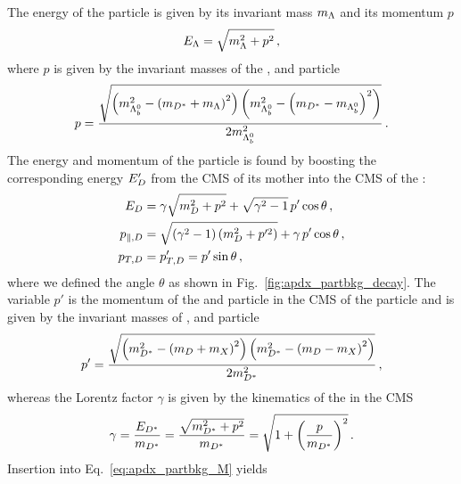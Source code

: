 The energy of the \Lz particle is given by its invariant mass $m_{{\Lambda}}$ and its momentum $p$
\begin{equation*}
    E_{{\Lambda}} = \sqrt{m_{{\Lambda}}^2 + p^2} \,,
\end{equation*}
where $p$ is given by the invariant masses of the \Lb, \Dstarz and \Lz particle
\begin{equation*}
    p = \frac{\sqrt{ \left(m_{{{\Lambda}^0_{b}}}^2 - \left(m_{{{D}^*}} + m_{{\Lambda}} \right)^2 \right) \left( m_{{{\Lambda}^0_{b}}}^2 - \left(m_{{{D}^*}} - m_{{{\Lambda}^0_{b}}} \right)^2 \right) }}{2 m_{{{\Lambda}^0_{b}}}^2} \,.
\end{equation*}
The energy and momentum of the \Dz particle is found by boosting the corresponding energy $E'_{D}$ from the CMS of its mother \Dstarz into the CMS of the \Lb:
\begin{align*}
    E_{D} &= \gamma \sqrt{m_{D}^2 + p^2} + \sqrt{\gamma^2 - 1} \, p' \cos \theta \,, \\
    p_{\parallel,D} &= \sqrt{\left( \gamma^2 - 1 \right) \left(m_{D}^2 + p'^2 \right)} + \gamma \, p' \cos \theta \,, \\
    p_{T,D} &= p'_{T,D} = p' \sin \theta \,,
\end{align*}
where we defined the angle $\theta$ as shown in Fig.~\ref{fig:apdx_partbkg_decay}.
The variable $p'$ is the momentum of the \Dz and \PX particle in the CMS of the \Dstarz particle and is given by the invariant masses of \Dstarz, \Dz and \Px particle 
\begin{equation*}
    p' = \frac{\sqrt{ \left(m_{{{D}^*}}^2 - \left(m_{D} + m_{X} \right)^2 \right) \left( m_{{{D}^*}}^2 - \left(m_{D} - m_{X} \right)^2 \right) }}{2 m_{{{D}^*}}^2} \,,
\end{equation*}
whereas the Lorentz factor $\gamma$ is given by the kinematics of the \Dstarz in the \Lb CMS
\begin{equation*}
    \gamma = \frac{E_{{{D}^*}}}{m_{{{D}^*}}} = \frac{\sqrt{m^2_{{{D}^*}} + p^2}}{m_{{{D}^*}}} = \sqrt{1 + \left( \frac{p}{m_{{{D}^*}}} \right)^2} \,.
\end{equation*}
Insertion into Eq.~\eqref{eq:apdx_partbkg_M} yields
